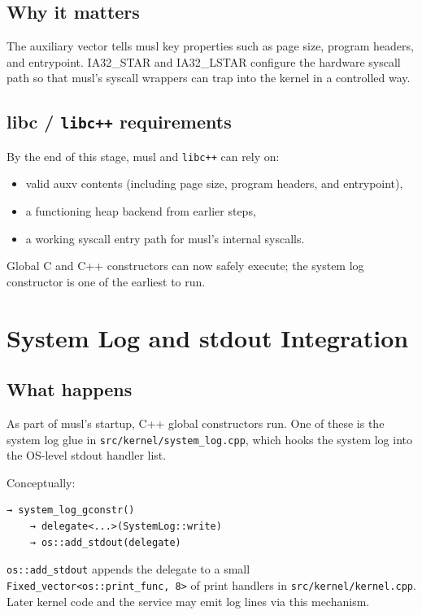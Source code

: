 \documentclass[a4paper,11pt]{article}
\begin{document}
\subsection{Why it matters}

The auxiliary vector tells musl key properties such as page size,
program headers, and entrypoint. IA32\_STAR and IA32\_LSTAR configure the
hardware syscall path so that musl’s syscall wrappers can trap into the
kernel in a controlled way.

\subsection{libc / \texorpdfstring{\texttt{libc++}}{libc++} requirements}

By the end of this stage, musl and \texttt{libc++} can rely on:

\begin{itemize}
  \item valid auxv contents (including page size, program headers, and
        entrypoint),
  \item a functioning heap backend from earlier steps,
  \item a working syscall entry path for musl’s internal syscalls.
\end{itemize}

Global C and C++ constructors can now safely execute; the system log
constructor is one of the earliest to run.

\section{System Log and stdout Integration}

\subsection{What happens}

As part of musl’s startup, C++ global constructors run. One of these is
the system log glue in \texttt{src/kernel/system\_log.cpp}, which hooks
the system log into the OS-level stdout handler list.

Conceptually:

\begin{verbatim}
→ system_log_gconstr()
    → delegate<...>(SystemLog::write)
    → os::add_stdout(delegate)
\end{verbatim}

\texttt{os::add\_stdout} appends the delegate to a small
\texttt{Fixed\_vector<os::print\_func, 8>} of print handlers in
\texttt{src/kernel/kernel.cpp}. Later kernel code and the service may
emit log lines via this mechanism.
\end{document}
